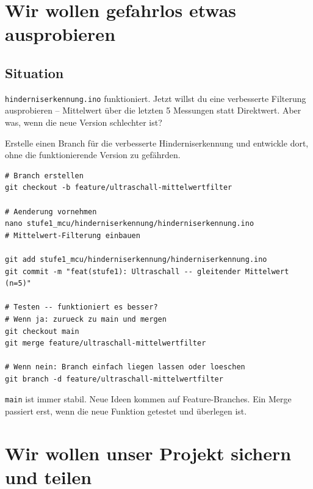 \chapter{Wir wollen gefahrlos etwas ausprobieren}

\kapitelstruktur

\section{Situation}

\texttt{hinderniserkennung.ino} funktioniert. Jetzt willst
du eine verbesserte Filterung ausprobieren -- Mittelwert
über die letzten 5 Messungen statt Direktwert.
Aber was, wenn die neue Version schlechter ist?

\begin{aufgabeBox}
Erstelle einen Branch für die verbesserte Hinderniserkennung
und entwickle dort, ohne die funktionierende Version zu gefährden.
\end{aufgabeBox}

\begin{lstlisting}[style=bash]
# Branch erstellen
git checkout -b feature/ultraschall-mittelwertfilter

# Aenderung vornehmen
nano stufe1_mcu/hinderniserkennung/hinderniserkennung.ino
# Mittelwert-Filterung einbauen

git add stufe1_mcu/hinderniserkennung/hinderniserkennung.ino
git commit -m "feat(stufe1): Ultraschall -- gleitender Mittelwert (n=5)"

# Testen -- funktioniert es besser?
# Wenn ja: zurueck zu main und mergen
git checkout main
git merge feature/ultraschall-mittelwertfilter

# Wenn nein: Branch einfach liegen lassen oder loeschen
git branch -d feature/ultraschall-mittelwertfilter
\end{lstlisting}

\begin{merksatzBox}
\texttt{main} ist immer stabil. Neue Ideen kommen auf
Feature-Branches. Ein Merge passiert erst, wenn die
neue Funktion getestet und überlegen ist.
\end{merksatzBox}

\chapter{Wir wollen unser Projekt sichern und teilen}

